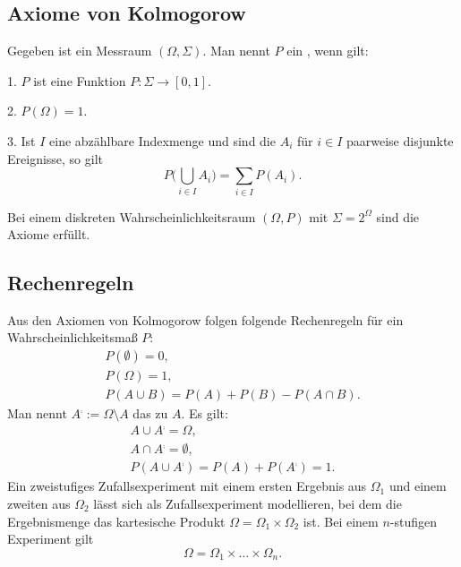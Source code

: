 \subsection{Axiome von Kolmogorow}
\begin{definition}\mbox{}\newline%
%
Gegeben ist ein Messraum $(\Omega,\Sigma)$. Man nennt $P$ ein
, wenn gilt:

1. $P$ ist eine Funktion $P\colon\Sigma\to [0,1]$.

2. $P(\Omega)=1$.

3. Ist $I$ eine abzählbare Indexmenge und sind die $A_i$
für $i\in I$ paarweise disjunkte Ereignisse, so gilt
\begin{equation}
P\Big(\bigcup_{i\in I} A_i\Big) = \sum_{i\in I}P(A_i).
\end{equation}
\end{definition}

\noindent
Bei einem diskreten Wahrscheinlichkeitsraum $(\Omega,P)$ mit
$\Sigma=2^\Omega$ sind die Axiome erfüllt.

\subsection{Rechenregeln}
Aus den Axiomen von Kolmogorow folgen folgende
Rechenregeln für ein Wahrscheinlichkeitsmaß $P$:
\begin{gather}
P(\emptyset) = 0,\\
P(\Omega) = 1,\\
P(A\cup B) = P(A)+P(B)-P(A\cap B).
\end{gather}
Man nennt $A^\comp:=\Omega\setminus A$ das
zu $A$. Es gilt:
\begin{gather}
A\cup A^\comp = \Omega,\\
A\cap A^\comp = \emptyset,\\
P(A\cup A^\comp) = P(A)+P(A^\comp) = 1.
\end{gather}
Ein zweistufiges Zufallsexperiment mit einem ersten Ergebnis aus
$\Omega_1$ und einem zweiten aus $\Omega_2$ lässt sich als
Zufallsexperiment modellieren, bei dem die Ergebnismenge das
kartesische Produkt $\Omega=\Omega_1\times\Omega_2$ ist. Bei einem
$n$-stufigen Experiment gilt
\begin{equation}
\Omega = \Omega_1\times\ldots\times\Omega_n.
\end{equation}

